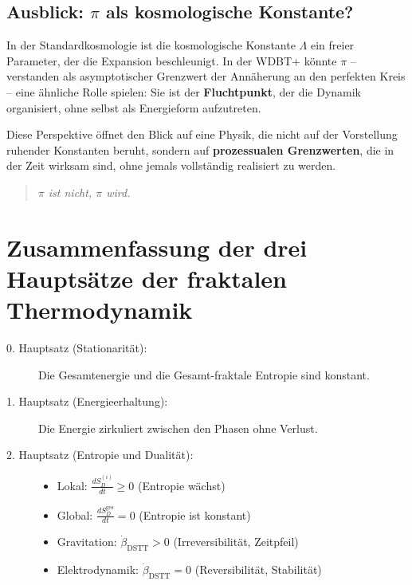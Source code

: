 \documentclass[12pt,a4paper]{article}
\begin{document}
\subsection{Ausblick: $\pi$ als kosmologische Konstante?}

In der Standardkosmologie ist die kosmologische Konstante $\Lambda$ ein freier Parameter, der die Expansion beschleunigt. In der WDBT+ könnte $\pi$ – verstanden als asymptotischer Grenzwert der Annäherung an den perfekten Kreis – eine ähnliche Rolle spielen: Sie ist der \textbf{Fluchtpunkt}, der die Dynamik organisiert, ohne selbst als Energieform aufzutreten.

Diese Perspektive öffnet den Blick auf eine Physik, die nicht auf der Vorstellung ruhender Konstanten beruht, sondern auf \textbf{prozessualen Grenzwerten}, die in der Zeit wirksam sind, ohne jemals vollständig realisiert zu werden.

\begin{quote}
\emph{$\pi$ ist nicht, $\pi$ wird.}
\end{quote}

\section{Zusammenfassung der drei Hauptsätze der fraktalen Thermodynamik}

\begin{description}
    \item[0. Hauptsatz (Stationarität):] Die Gesamtenergie und die Gesamt-fraktale Entropie sind konstant.
    \item[1. Hauptsatz (Energieerhaltung):] Die Energie zirkuliert zwischen den Phasen ohne Verlust.
    \item[2. Hauptsatz (Entropie und Dualität):] 
        \begin{itemize}
            \item Lokal: $\displaystyle \frac{dS_D^{(i)}}{dt} \geq 0$ (Entropie wächst)
            \item Global: $\displaystyle \frac{dS_D^{\text{ges}}}{dt} = 0$ (Entropie ist konstant)
            \item Gravitation: $\displaystyle \dot{\beta}_{\text{DSTT}} > 0$ (Irreversibilität, Zeitpfeil)
            \item Elektrodynamik: $\displaystyle \dot{\beta}_{\text{DSTT}} = 0$ (Reversibilität, Stabilität)
        \end{itemize}
\end{description}
\end{document}

